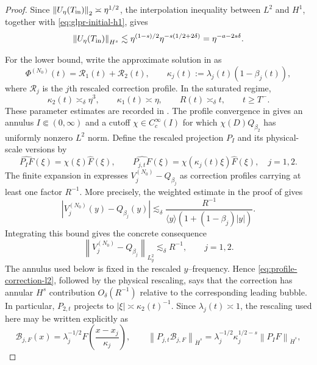 \documentclass[11pt,reqno]{amsart}
\numberwithin{equation}{section}
\theoremstyle{remark}
\newcommand{\norm}[1]{\left\lVert #1\right\rVert}
\begin{document}
\begin{proof}
Since $\norm{U_\eta(T_{\rm in})}_2\asymp\eta^{1/2}$,
the interpolation inequality between $L^2$ and $H^1$, together with
\eqref{eq:glpr-initial-h1}, gives
\[
 \norm{U_\eta(T_{\rm in})}_{H^s}
 \lesssim
 \eta^{(1-s)/2}
 \eta^{-s(1/2+2\delta)}
 =\eta^{-a-2s\delta}.
\]

For the lower bound, write the approximate solution in
\cite[Proposition~4.6]{GLPR} as
\[
 \Phi^{(N_0)}(t)=\mathcal R_1(t)+\mathcal R_2(t),\qquad
 \kappa_j(t):=\lambda_j(t)(1-\beta_j(t)),
\]
where $\mathcal R_j$ is the $j$th rescaled correction profile.  In the
saturated regime,
\[
 \kappa_2(t)\asymp_\delta\eta^3,\qquad
 \kappa_1(t)\asymp\eta,\qquad R(t)\asymp_\delta t,
 \qquad t\geq T^-.
\]
These parameter estimates are recorded in
\cite[Theorem~1.2 and Lemma~4.15]{GLPR}.
The profile convergence in \cite[Proposition~2.3]{GLPR} gives an annulus
$I\Subset(0,\infty)$ and a cutoff $\chi\in C_c^\infty(I)$ for which
$\chi(D)Q_{\beta_2}$ has uniformly nonzero $L^2$ norm.  Define the rescaled
projection $P_I$ and its physical-scale versions by
\[
 \widehat{P_IF}(\xi)=\chi(\xi)\widehat F(\xi),\qquad
 \widehat{P_{j,t}F}(\xi)=\chi(\kappa_j(t)\xi)\widehat F(\xi),
 \quad j=1,2.
\]
The finite expansion in \cite[Proposition~4.6]{GLPR} expresses
$V_j^{(N_0)}-Q_{\beta_j}$ as correction profiles carrying at least one factor
$R^{-1}$.  More precisely, the weighted estimate in the proof of
\cite[Corollary~4.7]{GLPR} gives
\[
 |V_j^{(N_0)}(y)-Q_{\beta_j}(y)|
 \lesssim_\delta
 \frac{R^{-1}}{\langle y\rangle(1+(1-\beta_j)|y|)}.
\]
Integrating this bound gives the concrete consequence
\begin{equation}\label{eq:profile-correction-l2}
 \norm{V_j^{(N_0)}-Q_{\beta_j}}_{L_y^2}
 \lesssim_\delta R^{-1},\qquad j=1,2.
\end{equation}
The annulus used below is fixed in the rescaled $y$--frequency.  Hence
\eqref{eq:profile-correction-l2}, followed by the physical rescaling, says
that the correction has annular $H^s$ contribution $O_\delta(R^{-1})$
relative to the corresponding leading bubble.  In particular, $P_{2,t}$
projects to $|\xi|\asymp\kappa_2(t)^{-1}$.  Since
$\lambda_j(t)\asymp1$, the rescaling used here may be written explicitly as
\begin{equation}\label{eq:annular-rescaling}
 \mathcal B_{j,F}(x)
 =\lambda_j^{-1/2}F\left(\frac{x-x_j}{\kappa_j}\right),
 \qquad
 \norm{P_{j,t}\mathcal B_{j,F}}_{\dot H^s}
 =\lambda_j^{-1/2}\kappa_j^{1/2-s}
 \norm{P_I F}_{\dot H^s},
\end{equation}

\end{proof}
\end{document}
